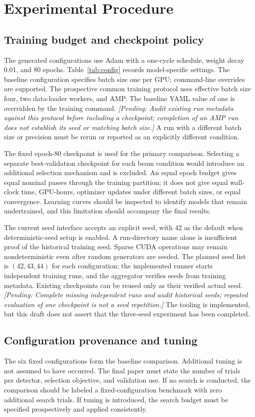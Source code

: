 \documentclass[10pt,twocolumn]{article}
\newcommand{\pending}[1]{\textcolor{blue!55!black}{\textit{[Pending: #1]}}}
\begin{document}
\section{Experimental Procedure}
\label{sec:experiments}
\subsection{Training budget and checkpoint policy}
The generated configurations use Adam with a one-cycle schedule, weight decay 0.01, and 80 epochs. Table~\ref{tab:config} records model-specific settings. The baseline configuration specifies batch size one per GPU; command-line overrides are supported. The prospective common training protocol uses effective batch size four, two data-loader workers, and AMP. The baseline YAML value of one is overridden by the training command. \pending{Audit existing run metadata against this protocol before including a checkpoint; completion of an AMP run does not establish its seed or matching batch size.} A run with a different batch size or precision must be rerun or reported as an explicitly different condition.

The fixed epoch-80 checkpoint is used for the primary comparison. Selecting a separate best-validation checkpoint for each beam condition would introduce an additional selection mechanism and is excluded. An equal epoch budget gives equal nominal passes through the training partition; it does not give equal wall-clock time, GPU-hours, optimizer updates under different batch sizes, or equal convergence. Learning curves should be inspected to identify models that remain undertrained, and this limitation should accompany the final results.

The current seed interface accepts an explicit seed, with 42 as the default when deterministic-seed setup is enabled. A run-directory name alone is insufficient proof of the historical training seed. Sparse CUDA operations may remain nondeterministic even after random generators are seeded. The planned seed list is $(42,43,44)$ for each configuration; the implemented runner starts independent training runs, and the aggregator verifies seeds from training metadata. Existing checkpoints can be reused only as their verified actual seed. \pending{Complete missing independent runs and audit historical seeds; repeated evaluation of one checkpoint is not a seed repetition.} The tooling is implemented, but this draft does not assert that the three-seed experiment has been completed.

\subsection{Configuration provenance and tuning}
The six fixed configurations form the baseline comparison. Additional tuning is not assumed to have occurred. The final paper must state the number of trials per detector, selection objective, and validation use. If no search is conducted, the comparison should be labeled a fixed-configuration benchmark with zero additional search trials. If tuning is introduced, the search budget must be specified prospectively and applied consistently.
\end{document}

